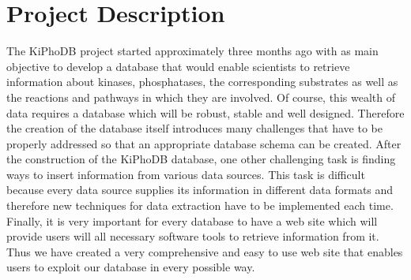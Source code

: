 \section{Project Description}
The KiPhoDB project started approximately three months ago with as main objective to develop a database that would enable scientists to retrieve information about kinases,
phosphatases, the corresponding substrates as well as the reactions and pathways in which they are involved.
Of course, this wealth of data requires a database which will be robust, stable and well designed.
Therefore the creation of the database itself introduces many challenges that have to be properly addressed so that an appropriate database schema can be created.
After the construction of the KiPhoDB database, one other challenging task is finding ways to insert information from various data sources.
This task is difficult because every data source supplies its information in different data formats and therefore new techniques for data extraction have to be implemented each time.
Finally, it is very important for every database to have a web site which will provide users will all necessary software tools to retrieve information from it.
Thus we have created a very comprehensive and easy to use web site that enables users to exploit our database in every possible way.
 
